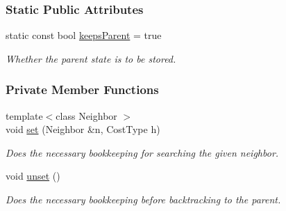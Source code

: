 \subsubsection*{Static Public Attributes}
\begin{DoxyCompactItemize}
\item 
static const bool \hyperlink{structslb_1_1ext_1_1policy_1_1backtrackLock_1_1Inplace_3_01MyAlgorithm_00_01true_01_4_a5f637322f0bd991877c9bfb9e48bccb4}{keeps\+Parent} = true\hypertarget{structslb_1_1ext_1_1policy_1_1backtrackLock_1_1Inplace_3_01MyAlgorithm_00_01true_01_4_a5f637322f0bd991877c9bfb9e48bccb4}{}\label{structslb_1_1ext_1_1policy_1_1backtrackLock_1_1Inplace_3_01MyAlgorithm_00_01true_01_4_a5f637322f0bd991877c9bfb9e48bccb4}

\begin{DoxyCompactList}\small\item\em Whether the parent state is to be stored. \end{DoxyCompactList}\end{DoxyCompactItemize}
\subsubsection*{Private Member Functions}
\begin{DoxyCompactItemize}
\item 
{\footnotesize template$<$class Neighbor $>$ }\\void \hyperlink{structslb_1_1ext_1_1policy_1_1backtrackLock_1_1Inplace_3_01MyAlgorithm_00_01true_01_4_a20f19ca5602c8c47bc4d2cc9e4e5fac1}{set} (Neighbor \&n, Cost\+Type h)
\begin{DoxyCompactList}\small\item\em Does the necessary bookkeeping for searching the given neighbor. \end{DoxyCompactList}\item 
void \hyperlink{structslb_1_1ext_1_1policy_1_1backtrackLock_1_1Inplace_3_01MyAlgorithm_00_01true_01_4_a20c434c629d4e15d7688493da6bb79ef}{unset} ()\hypertarget{structslb_1_1ext_1_1policy_1_1backtrackLock_1_1Inplace_3_01MyAlgorithm_00_01true_01_4_a20c434c629d4e15d7688493da6bb79ef}{}\label{structslb_1_1ext_1_1policy_1_1backtrackLock_1_1Inplace_3_01MyAlgorithm_00_01true_01_4_a20c434c629d4e15d7688493da6bb79ef}

\begin{DoxyCompactList}\small\item\em Does the necessary bookkeeping before backtracking to the parent. \end{DoxyCompactList}\end{DoxyCompactItemize}

